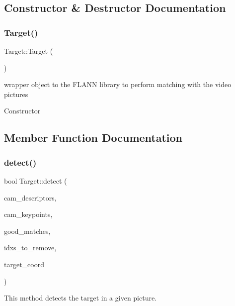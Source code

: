 \subsection{Constructor \& Destructor Documentation}
\mbox{\label{classTarget_a7008d6752ce64f82e56aae6ea6c2bb65}} 
\subsubsection{\texorpdfstring{Target()}{Target()}}
{\footnotesize\ttfamily Target\+::\+Target (\begin{DoxyParamCaption}{ }\end{DoxyParamCaption})}



wrapper object to the F\+L\+A\+NN library to perform matching with the video pictures 

Constructor 

\subsection{Member Function Documentation}
\mbox{\label{classTarget_ab4bfd2ba3ed56a749f15e18c3a50bb1c}} 
\subsubsection{\texorpdfstring{detect()}{detect()}}
{\footnotesize\ttfamily bool Target\+::detect (\begin{DoxyParamCaption}\item[{cv\+::\+Mat}]{cam\+\_\+descriptors,  }\item[{std\+::vector$<$ cv\+::\+Key\+Point $>$ \&}]{cam\+\_\+keypoints,  }\item[{std\+::vector$<$ cv\+::\+D\+Match $>$ \&}]{good\+\_\+matches,  }\item[{std\+::vector$<$ int $>$ \&}]{idxs\+\_\+to\+\_\+remove,  }\item[{std\+::vector$<$ cv\+::\+Point2f $>$ \&}]{target\+\_\+coord }\end{DoxyParamCaption})}



This method detects the target in a given picture. 


